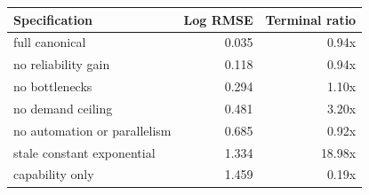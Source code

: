 \begin{tabular}{lrr}
\toprule
Specification & Log RMSE & Terminal ratio \\
\midrule
full canonical & 0.035 & 0.94x \\
no reliability gain & 0.118 & 0.94x \\
no bottlenecks & 0.294 & 1.10x \\
no demand ceiling & 0.481 & 3.20x \\
no automation or parallelism & 0.685 & 0.92x \\
stale constant exponential & 1.334 & 18.98x \\
capability only & 1.459 & 0.19x \\
\bottomrule
\end{tabular}
